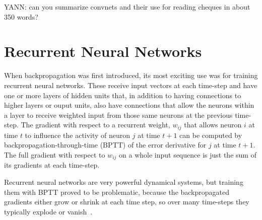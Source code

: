 \documentclass[]{article}
\begin{document}

YANN: can you summarize convnets and their use for reading cheques in about
350 words?

\citep{LeCun89-small}


\section{Recurrent Neural Networks}

When backpropagation was first introduced, its most exciting use was for
training recurrent neural networks. These receive input vectors at each
time-step and have one or more layers of hidden units that, in addition to
having connections to higher layers or ouput units, also have connections
that allow the neurons within a layer to receive weighted input from those
same neurons at the previous time-step.  The gradient with respect to a recurrent
weight, $w_{ij}$ that allows neuron $i$ at time $t$ to influence the
activity of neuron $j$ at time $t+1$ can be computed by
backpropagation-through-time (BPTT) of the error derivative for $j$ at time
$t+1$. The full gradient with respect to $w_{ij}$ on a whole input sequence is just the
sum of its gradients at each time-step.

Recurrent neural networks are very powerful dynamical systems, but training
them with BPTT proved to be problematic, because the backpropagated
gradients either grow or shrink at each time step, so over many time-steps
they typically explode or vanish~\citep{Bengio-et-al-TNN1994,Hochreiter91-small}.
\end{document}
